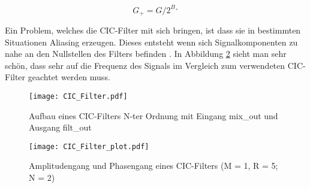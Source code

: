 \begin{equation}
G_+ = G/2^{B_+}
\label{equ:cic_gain+}
\end{equation}

Ein Problem, welches die CIC-Filter mit sich bringen, ist dass sie in bestimmten Situationen Aliasing erzeugen. Dieses entsteht wenn sich Signalkomponenten zu nahe an den Nullstellen des Filters befinden \cite{CIC_Aliasing}. In Abbildung \ref{img:CIC_Filter_plot} sieht man sehr schön, dass sehr auf die Frequenz des Signals im Vergleich zum verwendeten CIC-Filter geachtet werden muss.


\begin{figure}[h]
	\centering
	\texttt{[image: CIC\_Filter.pdf]}
	\caption{Aufbau eines CIC-Filters N-ter Ordnung mit Eingang mix\_out und Ausgang filt\_out}
	\label{img:CIC_Filter}
\end{figure}

\begin{figure}[h]
	\centering
	\texttt{[image: CIC\_Filter\_plot.pdf]}
	\caption{Amplitudengang und Phasengang eines CIC-Filters (M = 1, R = 5; N = 2)}
	\label{img:CIC_Filter_plot}
\end{figure}

\clearpage

